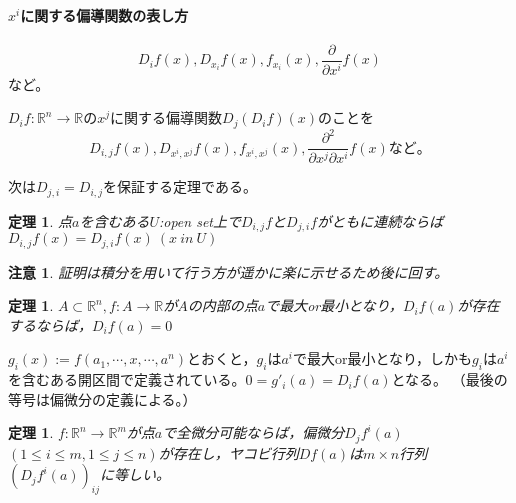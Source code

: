 \documentclass[dvipdfmx,a4j,10pt]{jsarticle}
\makeatletter
\theoremstyle{mystyle1}
\newtheorem{thm}[dfn]{定理}
\theoremstyle{mystyle2}
\newtheorem{note}{注意}
\renewenvironment{proof}[1][\proofname]{\par
  \pushQED{\qed}%
  \normalfont
  \topsep6\p@\@plus6\p@ \trivlist
  \item[\hskip\labelsep{\bfseries\sffamily #1}]\ignorespaces
}{%
  \popQED\endtrivlist\@endpefalse
}
\renewcommand\proofname{証明}
\makeatother
\begin{document}
\paragraph{$x^i$に関する偏導関数の表し方}
\[
D_if(x),D_{x_i}f(x),f_{x_i}(x),\frac{\partial}{\partial x^i}f(x)
\]
など。

$D_if:\mathbb{R}^n\to\mathbb{R}$の$x^j$に関する偏導関数$D_j(D_if)(x)$のことを
\[
D_{i,j}f(x),D_{x^i,x^j}f(x),f_{x^i,x^j}(x),\frac{\partial^2}{\partial x^j \partial x^i}f(x)
など。
\]

次は$D_{j,i}=D_{i,j}$を保証する定理である。
\begin{framed}
	\begin{thm}\label{th2.5}
		点$a$を含むある$U$:open set上で$D_{i,j}f$と$D_{j,i}f$がともに連続ならば$D_{i,j}f(x)=D_{j,i}f(x)\ (x\ in\ U)$
	\end{thm}
\end{framed}
\begin{note}
証明は積分を用いて行う方が遥かに楽に示せるため後に回す。
\end{note}

\begin{framed}
	\begin{thm}\label{th2.6}
		$A\subset\mathbb{R}^n,f:A\to\mathbb{R}$が$A$の内部の点$a$で最大or最小となり，$D_if(a)$が存在するならば，$D_if(a)=0$
	\end{thm}
\end{framed}

\begin{proof}
	$g_i(x):=f(a_1,\cdots,x,\cdots,a^n)$とおくと，$g_i$は$a^i$で最大or最小となり，しかも$g_i$は$a^i$を含むある開区間で定義されている。$0=g'_i(a)=D_if(a)$となる。	（最後の等号は偏微分の定義による。）
\end{proof}

\newpage

\begin{framed}
	\begin{thm}
		$f:\mathbb{R}^n\to\mathbb{R}^m$が点$a$で全微分可能ならば，偏微分$D_jf^i(a)$ $(1\leq i \leq m,1\leq j \leq n)$が存在し，ヤコビ行列$Df(a)$は$m\times n$行列$(D_jf^i(a))_{ij}$に等しい。
	\end{thm}
\end{framed}
\end{document}
